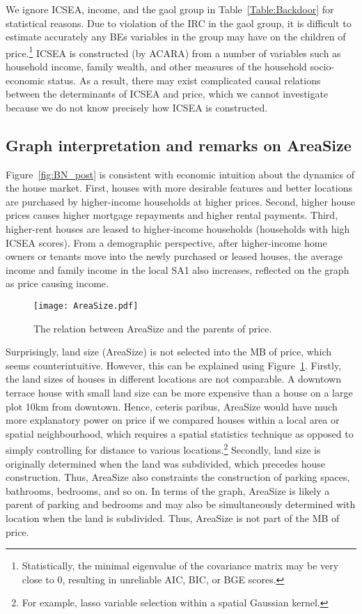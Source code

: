 \documentclass[11pt,review,authoryear]{elsarticle}
\begin{document}
We ignore ICSEA, income, and the gaol group in Table~\ref{Table:Backdoor} for statistical reasons. Due to violation of the IRC in the gaol group, it is difficult to estimate accurately any BEs variables in the group may have on the children of price.\footnote{Statistically, the minimal eigenvalue of the covariance matrix may be very close to $0$, resulting in unreliable AIC, BIC, or BGE scores.} ICSEA is constructed (by ACARA) from a number of variables such as household income, family wealth, and other measures of the household socio-economic status. As a result, there may exist complicated causal relations between the determinants of ICSEA and price, which we cannot investigate because we do not know precisely how ICSEA is constructed.

\subsection{Graph interpretation and remarks on AreaSize}

Figure~\ref{fig:BN_post} is consistent with economic intuition about the dynamics of the house market. First, houses with more desirable features and better locations are purchased by higher-income households at higher prices. Second, higher house prices causes higher mortgage repayments and higher rental payments. Third, higher-rent houses are leased to higher-income households (households with high ICSEA scores). From a demographic perspective, after higher-income home owners or tenants move into the newly purchased or leased houses, the average income and family income in the local SA1 also increases, reflected on the graph as price causing income.

\begin{figure}[H]
  \centering
  \texttt{[image: AreaSize.pdf]}
  \caption{The relation between AreaSize and the parents of price.}
  \label{fig:area_size}
\end{figure}

Surprisingly, land size (AreaSize) is not selected into the MB of price, which seems counterintuitive. However, this can be explained using Figure~\ref{fig:area_size}. Firstly, the land sizes of houses in different locations are not comparable. A downtown terrace house with small land size can be more expensive than a house on a large plot 10km from downtown. Hence, ceteris paribus, AreaSize would have much more explanatory power on price if we compared houses within a local area or spatial neighbourhood, which requires a spatial statistics technique as opposed to simply controlling for distance to various locations.\footnote{For example, lasso variable selection within a spatial Gaussian kernel.} Secondly, land size is originally determined when the land was subdivided, which precedes house construction. Thus, AreaSize also constraints the construction of parking spaces, bathrooms, bedrooms, and so on. In terms of the graph, AreaSize is likely a parent of parking and bedrooms and may also be simultaneously determined with location when the land is subdivided. Thus, AreaSize is not part of the MB of price.
\end{document}
